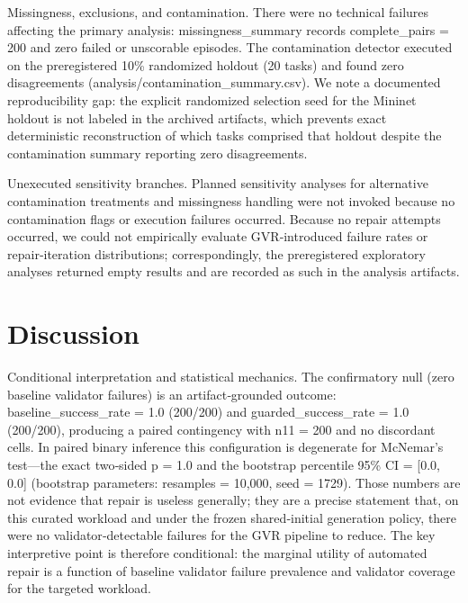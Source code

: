 \documentclass[conference]{IEEEtran}
\begin{document}
Missingness, exclusions, and contamination. There were no technical failures affecting the primary analysis: missingness\_summary records complete\_pairs = 200 and zero failed or unscorable episodes. The contamination detector executed on the preregistered 10\% randomized holdout (20 tasks) and found zero disagreements (analysis/contamination\_summary.csv). We note a documented reproducibility gap: the explicit randomized selection seed for the Mininet holdout is not labeled in the archived artifacts, which prevents exact deterministic reconstruction of which tasks comprised that holdout despite the contamination summary reporting zero disagreements.

Unexecuted sensitivity branches. Planned sensitivity analyses for alternative contamination treatments and missingness handling were not invoked because no contamination flags or execution failures occurred. Because no repair attempts occurred, we could not empirically evaluate GVR‑introduced failure rates or repair‑iteration distributions; correspondingly, the preregistered exploratory analyses returned empty results and are recorded as such in the analysis artifacts.

\section{Discussion}
Conditional interpretation and statistical mechanics. The confirmatory null (zero baseline validator failures) is an artifact‑grounded outcome: baseline\_success\_rate = 1.0 (200/200) and guarded\_success\_rate = 1.0 (200/200), producing a paired contingency with n11 = 200 and no discordant cells. In paired binary inference this configuration is degenerate for McNemar's test---the exact two‑sided p = 1.0 and the bootstrap percentile 95\% CI = [0.0, 0.0] (bootstrap parameters: resamples = 10,000, seed = 1729). Those numbers are not evidence that repair is useless generally; they are a precise statement that, on this curated workload and under the frozen shared‑initial generation policy, there were no validator‑detectable failures for the GVR pipeline to reduce. The key interpretive point is therefore conditional: the marginal utility of automated repair is a function of baseline validator failure prevalence and validator coverage for the targeted workload.
\end{document}
